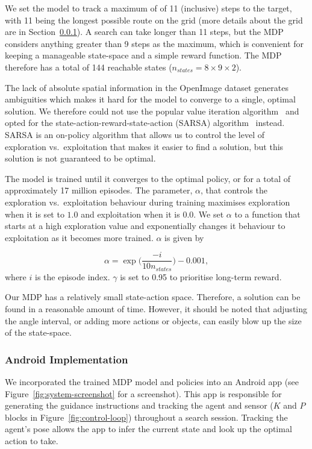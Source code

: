 \documentclass[a4paper, twoside]{article}
\begin{document}
We set the model to track a maximum of of 11 (inclusive) steps to the target, with 11 being the longest possible route on the grid (more details about the grid are in Section~\ref{sec:system-implementation}). A search can take longer than 11 steps, but the MDP considers anything greater than 9 steps as the maximum, which is convenient for keeping a manageable state-space and a simple reward function. The MDP therefore has a total of 144 reachable states ($n_{states}=8\times9\times2$).

The lack of absolute spatial information in the OpenImage dataset generates ambiguities which makes it hard for the model to converge to a single, optimal solution. We therefore could not use the popular value iteration algorithm~\cite{bellman1957markovian} and opted for the state-action-reward-state-action (SARSA) algorithm~\cite{rummery1994line} instead. SARSA is an on-policy algorithm that allows us to control the level of exploration vs.\ exploitation that makes it easier to find a solution, but this solution is not guaranteed to be optimal. 

The model is trained until it converges to the optimal policy, or for a total of approximately 17 million episodes. The parameter, $\alpha$, that controls the exploration vs.\ exploitation behaviour during training maximises exploration when it is set to $1.0$ and exploitation when it is $0.0$. We set $\alpha$ to a function that starts at a high exploration value and exponentially changes it behaviour to exploitation as it becomes more trained. $\alpha$ is given by 

\begin{equation}
  \alpha = \exp\Big(\frac{-i}{10n_{states}}\Big) - 0.001,
\end{equation}
where $i$ is the episode index.  $\gamma$ is set to 0.95 to prioritise long-term reward. 

Our MDP has a relatively small state-action space. Therefore, a solution can be found in a reasonable amount of time. However, it should be noted that adjusting the angle interval, or adding more actions or objects, can easily blow up the size of the state-space. 

\subsubsection{Android Implementation}\label{sec:system-implementation}

We incorporated the trained MDP model and policies into an Android app (see Figure~\ref{fig:system-screenshot} for a screenshot). This app is responsible for generating the guidance instructions and tracking the agent and sensor ($K$ and $P$ blocks in Figure~\ref{fig:control-loop}) throughout a search session. Tracking the agent's pose allows the app to infer the current state and look up the optimal action to take. 
\end{document}
